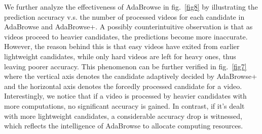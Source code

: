 \documentclass[sigconf]{acmart}
\begin{document}
We further analyze the effectiveness of AdaBrowse in fig.~\ref{fig8} by illustrating the prediction accuracy v.s. the number of processed videos for each candidate in AdaBrowse and AdaBrowse+. A possibly counterintuitive observation is that as videos proceed to heavier candidates, the predictions become more inaccurate. However, the reason behind this is that easy videos have exited from earlier lightweight candidates, while only hard videos are left for heavy ones, thus leaving poorer accuracy. This phenomenon can be further verified in fig.~\ref{fig7} where the vertical axis denotes the candidate adaptively decided by AdaBrowse+ and the horizontal axis denotes the forcedly processed candidate for a video. Interestingly, we notice that if a video is processed by heavier candidates with more computations, no significant accuracy is gained. In contrast, if it's dealt with more lightweight candidates, a considerable accuracy drop is witnessed, which reflects the intelligence of AdaBrowse to allocate computing resources.
  
\end{document}
